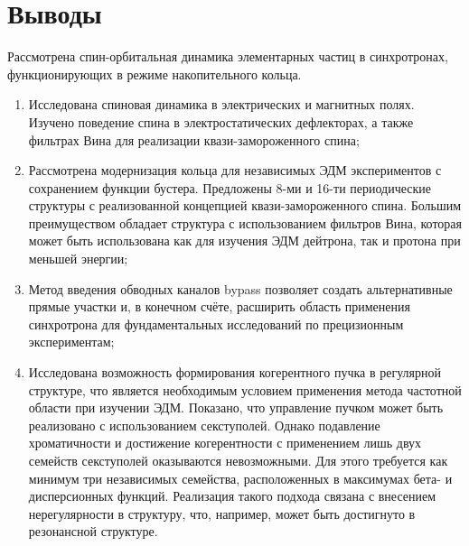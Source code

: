 	\section*{Выводы}
\par Рассмотрена спин-орбитальная динамика элементарных частиц в синхротронах, функционирующих в режиме накопительного кольца. 

\begin{enumerate}

\item Исследована спиновая динамика в электрических и магнитных полях. Изучено поведение спина в электростатических дефлекторах, а также фильтрах Вина для реализации квази-замороженного спина;

\item Рассмотрена модернизация кольца для независимых ЭДМ экспериментов с сохранением функции бустера. Предложены 8-ми и 16-ти периодические структуры с реализованной концепцией квази-замороженного спина. Большим преимуществом обладает структура с использованием фильтров Вина, которая может быть использована как для изучения ЭДМ дейтрона, так и протона при меньшей энергии;

\item Метод введения обводных каналов bypass позволяет создать альтернативные прямые участки и, в конечном счёте, расширить область применения синхротрона для фундаментальных исследований по прецизионным экспериментам; 

\item Исследована возможность формирования когерентного пучка в регулярной структуре, что является необходимым условием применения метода частотной области при изучении ЭДМ. Показано, что управление пучком может быть реализовано с использованием секступолей. Однако подавление хроматичности и достижение когерентности с применением лишь двух семейств секступолей оказываются невозможными. Для этого требуется как минимум три независимых семейства, расположенных в максимумах бета- и дисперсионных функций. Реализация такого подхода связана с внесением нерегулярности в структуру, что, например, может быть достигнуто в резонансной структуре.

\end{enumerate}

\FloatBarrier
